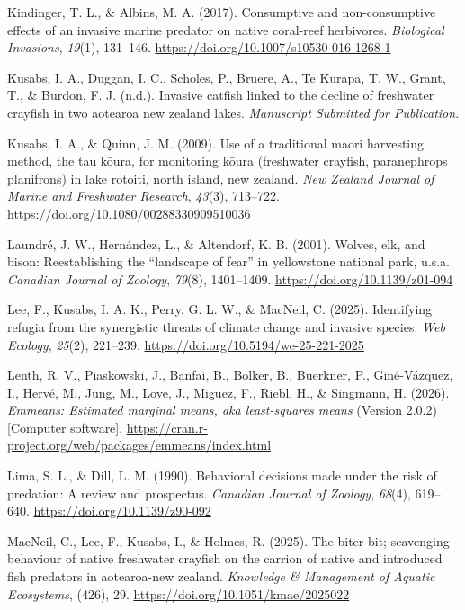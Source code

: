 \documentclass[
  letterpaper,
  DIV=11,
  numbers=noendperiod]{scrartcl}
\newlength{\cslhangindent}
\newenvironment{CSLReferences}[2] %
 {\begin{list}{}{%
  \setlength{\itemindent}{0pt}
  \setlength{\leftmargin}{0pt}
  \setlength{\parsep}{0pt}
  \ifodd #1
   \setlength{\leftmargin}{\cslhangindent}
   \setlength{\itemindent}{-1\cslhangindent}
  \fi
  \setlength{\itemsep}{#2\baselineskip}}}
 {\end{list}}
\begin{document}
\begin{CSLReferences}{1}{0}
Kindinger, T. L., \& Albins, M. A. (2017). Consumptive and
non-consumptive effects of an invasive marine predator on native
coral-reef herbivores. \emph{Biological Invasions}, \emph{19}(1),
131--146. \url{https://doi.org/10.1007/s10530-016-1268-1}

Kusabs, I. A., Duggan, I. C., Scholes, P., Bruere, A., Te Kurapa, T. W.,
Grant, T., \& Burdon, F. J. (n.d.). Invasive catfish linked to the
decline of freshwater crayfish in two aotearoa new zealand lakes.
\emph{Manuscript Submitted for Publication}.

Kusabs, I. A., \& Quinn, J. M. (2009). Use of a traditional maori
harvesting method, the tau kōura, for monitoring kōura (freshwater
crayfish, paranephrops planifrons) in lake rotoiti, north island, new
zealand. \emph{New Zealand Journal of Marine and Freshwater Research},
\emph{43}(3), 713--722. \url{https://doi.org/10.1080/00288330909510036}

Laundré, J. W., Hernández, L., \& Altendorf, K. B. (2001). Wolves, elk,
and bison: Reestablishing the {``landscape of fear''} in yellowstone
national park, u.s.a. \emph{Canadian Journal of Zoology}, \emph{79}(8),
1401--1409. \url{https://doi.org/10.1139/z01-094}

Lee, F., Kusabs, I. A. K., Perry, G. L. W., \& MacNeil, C. (2025).
Identifying refugia from the synergistic threats of climate change and
invasive species. \emph{Web Ecology}, \emph{25}(2), 221--239.
\url{https://doi.org/10.5194/we-25-221-2025}

Lenth, R. V., Piaskowski, J., Banfai, B., Bolker, B., Buerkner, P.,
Giné-Vázquez, I., Hervé, M., Jung, M., Love, J., Miguez, F., Riebl, H.,
\& Singmann, H. (2026). \emph{Emmeans: Estimated marginal means, aka
least-squares means} (Version 2.0.2) {[}Computer software{]}.
\url{https://cran.r-project.org/web/packages/emmeans/index.html}

Lima, S. L., \& Dill, L. M. (1990). Behavioral decisions made under the
risk of predation: A review and prospectus. \emph{Canadian Journal of
Zoology}, \emph{68}(4), 619--640. \url{https://doi.org/10.1139/z90-092}

MacNeil, C., Lee, F., Kusabs, I., \& Holmes, R. (2025). The biter bit;
scavenging behaviour of native freshwater crayfish on the carrion of
native and introduced fish predators in aotearoa-new zealand.
\emph{Knowledge \& Management of Aquatic Ecosystems}, (426), 29.
\url{https://doi.org/10.1051/kmae/2025022}


\end{CSLReferences}
\end{document}
